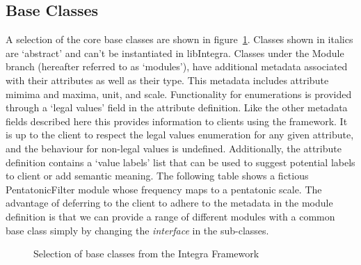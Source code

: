 \documentclass[twoside,10pt,a4paper]{article}
\begin{document}
\subsection{Base Classes}\label{subsec:base_classes}

A selection of the core base classes are shown in figure~\ref{fig:class_diagram}. Classes shown in italics are `abstract' and can't be instantiated in libIntegra. Classes under the Module branch (hereafter referred to as `modules'), have additional metadata associated with their attributes as well as their type. This metadata includes attribute mimima and maxima, unit, and scale. Functionality for enumerations is provided \linebreak through a `legal values' field in the attribute definition. Like the other metadata fields described here this provides information to clients using the framework. It is up to the client to respect the legal values enumeration for any given attribute, and the behaviour for non-legal values is undefined. Additionally, the attribute definition contains a `value labels' list that can be used to suggest potential labels to client or add semantic meaning. The following table shows a fictious PentatonicFilter module whose frequency maps to a pentatonic scale. The advantage of deferring to the client to adhere to the metadata in the module definition is that we can provide a range of different modules with a common base class simply by changing the {\it interface} in the sub-classes.

\begin{figure}[htbp]
\centerline{}
\caption{Selection of base classes from the Integra Framework}
\label{fig:class_diagram}
\end{figure}
\end{document}
